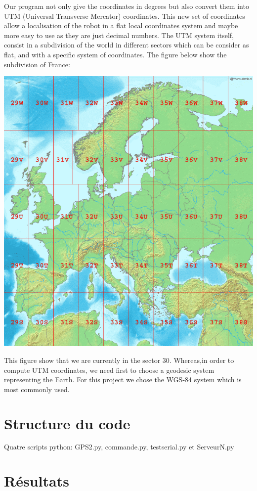 \documentclass[10pt,a4paper]{report}
\begin{document}
Our program not only give the coordinates in degrees but also convert them into UTM (Universal Transverse Mercator) coordinates. This new set of coordinates allow a localisation of the robot in a flat local coordinates system and maybe more easy to use as they are just decimal numbers. The UTM system itself, consist in a subdivision of the world in different sectors which can be consider as flat, and with a specific system of coordinates.
The figure below show the subdivision of France: \

\begin{center}
\includegraphics[scale=0.2]{secteurUTM.png} 
\label{fig1}
\end{center}

This figure show that we are currently in the sector 30. Whereas,in order to compute UTM coordinates, we need first to choose a geodesic system representing the Earth. For this project we chose the WGS-84 system which is most commonly used.


\section{Structure du code}

Quatre scripts python: GPS2.py, commande.py, testserial.py et ServeurN.py

\section{Résultats}
\end{document}

